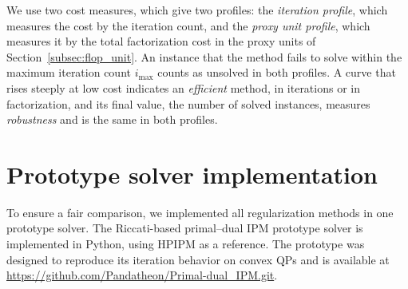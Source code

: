 \documentclass[class=scrbook, crop=false]{standalone}
\begin{document}
We use two cost measures, which give two profiles:
the \emph{iteration profile}, which measures the cost by the iteration count,
and the \emph{proxy unit profile}, which measures it by the total factorization cost in the proxy units of Section~\ref{subsec:flop_unit}.
An instance that the method fails to solve within the maximum iteration count $i_\mathrm{max}$ counts as unsolved in both profiles.
A curve that rises steeply at low cost indicates an \emph{efficient} method, in iterations or in factorization,
and its final value, the number of solved instances, measures \emph{robustness} and is the same in both profiles.





\section{Prototype solver implementation}
\label{sec:prototype}
To ensure a fair comparison, we implemented all regularization methods in one prototype solver.
The Riccati-based primal--dual \gls{IPM} prototype solver is implemented in Python, using HPIPM as a reference.
The prototype was designed to reproduce its iteration behavior on convex \glspl{QP} and is available at \url{https://github.com/Pandatheon/Primal-dual_IPM.git}.
\end{document}
